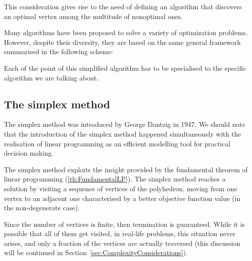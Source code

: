 This consideration gives rise to the need of defining an algorithm
that discovers an optimal vertex among the multitude of nonoptimal ones.

Many algorithms have been proposed to solve a variety of optimization
problems. However, despite their diversity, they are based on the same 
general framework summarised in the following scheme:


Each of the point of this simplified algorithm has to be specialised
to the specific algorithm we are talking about.

%
%
\subsection{The simplex method}

The simplex method was introduced by George Dantzig in 1947.
We should note that the
introduction of the simplex method happened simultaneously with
the realisation of linear programming as an efficient modelling tool
for practical decision making. 

The simplex method exploits the insight provided by the fundamental 
theorem of linear programming (\ref{th:FundamentalLP}).
The simplex method reaches a solution by visiting a sequence of 
vertices of the polyhedron, moving from one vertex to an adjacent 
one characterised by a better objective function value
(in the non-degenerate case). 

Since the number of vertices is finite, then termination is guaranteed.
While it is possible that all of them get visited, in real-life problems, 
this situation never arises, and only a fraction of the vertices are
actually traversed (this discussion will be continued in 
Section~\ref{sec:ComplexityConsiderations}).

